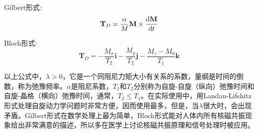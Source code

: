\documentclass{buaaemp}
\begin{document}
Gilbert形式:
\begin{equation}
\mathbf{T}_D=\frac{\alpha}{M}\mathbf{M}\times \frac{{\rm d}\mathbf{M}}{{\rm d}t}\label{9.1-3}
\end{equation}

Bloch形式:
\begin{equation}
\mathbf{T}_D=-\frac{M_x}{T_2}\mathbf{i}-\frac{M_y}{T_2}\mathbf{j}-\frac{M_z-M_0}{T_1}\mathbf{k}\label{9.1-4}
\end{equation}

以上公式中，$\lambda>0$，它是一个同阻尼力矩大小有关系的系数，量纲是时间的倒数，称为弛豫频率。$\alpha$是阻尼系数，$T_1$和$T_2$分别称为自旋-自旋（纵向）弛豫时间和自旋-晶格（横向）弛豫时间，通常，$T_2\le T_1$。在实际使用中，用Landau-Lifshitz形式处理自旋动力学问题时非常方便，因而使用最多，但是，当$\lambda$很大时，会出现矛盾。Gilbert形式在数学处理上最为简单，Bloch形式能对人体内所有核磁共振现象给出非常满意的描述，所以多在医学上讨论核磁共振原理和信号处理时被应用。
\end{document}
